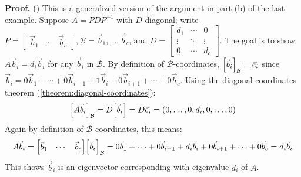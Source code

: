 \documentclass[11pt, letterpaper]{report}
\newenvironment{book}{}{}
\let\originalleft\left
\let\originalright\right
\renewcommand{\left}{\mathopen{}\mathclose\bgroup\originalleft}
\renewcommand{\right}{\aftergroup\egroup\originalright}
\newcounter{example}[section]
\newcounter{theorem}[chapter]
\begin{document}
\begin{book}
\textbf{Proof.} (\rightarrow) This is a generalized version of the argument in part (b) of the last example. Suppose $A = PDP^{-1}$ with $D$ diagonal; write $P=\begin{bmatrix} \vec{b}_1 & \cdots & \vec{b}_c \end{bmatrix}, \mathcal{B}=\vec{b}_1,\ldots, \vec{b}_{c}$, and $D = \begin{bmatrix}
d_1 & \cdots & 0 \\
\vdots & \ddots & \vdots \\
0 & \cdots & d_c
\end{bmatrix}$. The goal is to show $A\vec{b}_i = d_i\vec{b}_i$ for any $\vec{b}_i$ in $\mathcal{B}$. By definition of $\mathcal{B}$-coordinates, $\left[ \vec{b}_i \right]_{\mathcal{B}}=\vec{e}_i$ since $\vec{b}_i= 0\vec{b}_1 + \cdots + 0\vec{b}_{i-1}+1\vec{b}_i+0\vec{b}_{i+1}+\cdots + 0\vec{b}_c$. Using the diagonal coordinates theorem (\ref{theorem:diagonal-coordinates}):
\begin{align*}
\left[ A\vec{b}_i \right]_{\mathcal{B}} = D \left[ \vec{b}_i \right] = D\vec{e}_i = ( 0, \ldots, 0, d_i, 0, \ldots, 0 )
\end{align*}
Again by definition of $\mathcal{B}$-coordinates, this means:
\[A\vec{b}_i = \begin{bmatrix}
\vec{b}_1 & \cdots & \vec{b}_c 
\end{bmatrix} \left[ \vec{b}_i \right]_{\mathcal{B}} = 0\vec{b}_1+\cdots+0\vec{b}_{i-1}+d_i\vec{b}_i+0\vec{b}_{i+1}+ \cdots + 0\vec{b}_c  = d_i\vec{b}_i
\]
This shows $\vec{b}_i$ is an eigenvector corresponding with eigenvalue $d_i$ of $A$.


\end{book}
\end{document}
